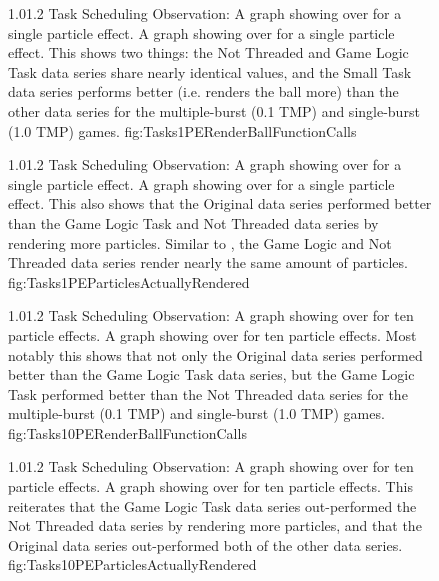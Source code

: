 \begin{figure}
\addtocounter{figure}{-1}

	\vspace{-1.5cm}
	{1.0}{1.2}
	{Task Scheduling Observation: A graph showing  over  for a single particle effect.}
	{A graph showing  over  for a single particle effect. This shows two things: the Not Threaded and Game Logic Task data series share nearly identical values, and the Small Task data series performs better (i.e. renders the ball more) than the other data series for the multiple-burst (0.1 TMP) and single-burst (1.0 TMP) games.}
	{fig:Tasks1PERenderBallFunctionCalls}

	{1.0}{1.2}
	{Task Scheduling Observation: A graph showing  over  for a single particle effect.}
	{A graph showing  over  for a single particle effect. This also shows that the Original data series performed better than the Game Logic Task and Not Threaded data series by rendering more particles. Similar to , the Game Logic and Not Threaded data series render nearly the same amount of particles.}
	{fig:Tasks1PEParticlesActuallyRendered}

\end{figure}

\begin{figure}
\addtocounter{figure}{-1}

	\vspace{-1.5cm}
	{1.0}{1.2}
	{Task Scheduling Observation: A graph showing  over  for ten particle effects.}
	{A graph showing  over  for ten particle effects. Most notably this shows that not only the Original data series performed better than the Game Logic Task data series, but the Game Logic Task performed better than the Not Threaded data series for the multiple-burst (0.1 TMP) and single-burst (1.0 TMP) games.}
	{fig:Tasks10PERenderBallFunctionCalls}

	{1.0}{1.2}
	{Task Scheduling Observation: A graph showing  over  for ten particle effects.}
	{A graph showing  over  for ten particle effects. This reiterates that the Game Logic Task data series out-performed the Not Threaded data series by rendering more particles, and that the Original data series out-performed both of the other data series.}
	{fig:Tasks10PEParticlesActuallyRendered}

\end{figure}

